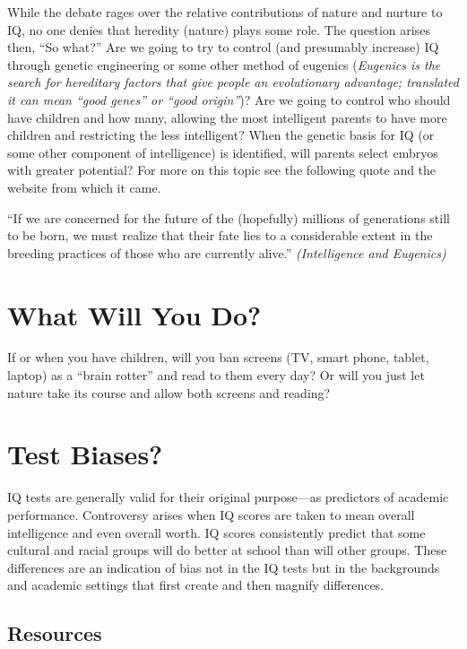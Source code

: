 \documentclass[
]{book}
\begin{document}
While the debate rages over the relative contributions of nature and nurture to IQ, no one denies that heredity (nature) plays some role. The question arises then, ``So what?'' Are we going to try to control (and presumably increase) IQ through genetic engineering or some other method of eugenics (\emph{Eugenics is the search for hereditary factors that give people an evolutionary advantage; translated it can mean ``good genes'' or ``good origin''})? Are we going to control who should have children and how many, allowing the most intelligent parents to have more children and restricting the less intelligent? When the genetic basis for IQ (or some other component of intelligence) is identified, will parents select embryos with greater potential? For more on this topic see the following quote and the website from which it came.

``If we are concerned for the future of the (hopefully) millions of generations still to be born, we must realize that their fate lies to a considerable extent in the breeding practices of those who are currently alive.'' \emph{(Intelligence and Eugenics)}

\hypertarget{what-will-you-do}{%
\section{What Will You Do?}\label{what-will-you-do}}

If or when you have children, will you ban screens (TV, smart phone, tablet, laptop) as a ``brain rotter'' and read to them every day? Or will you just let nature take its course and allow both screens and reading?

\hypertarget{test-biases}{%
\section{Test Biases?}\label{test-biases}}

IQ tests are generally valid for their original purpose---as predictors of aca­demic performance. Controversy arises when IQ scores are taken to mean over­all intelligence and even overall worth. IQ scores consistently predict that some cultural and racial groups will do better at school than will other groups. These differ­ences are an indication of bias not in the IQ tests but in the back­grounds and academic settings that first create and then magnify differences.

\hypertarget{resources-3}{%
\subsection*{Resources}\label{resources-3}}
\end{document}
